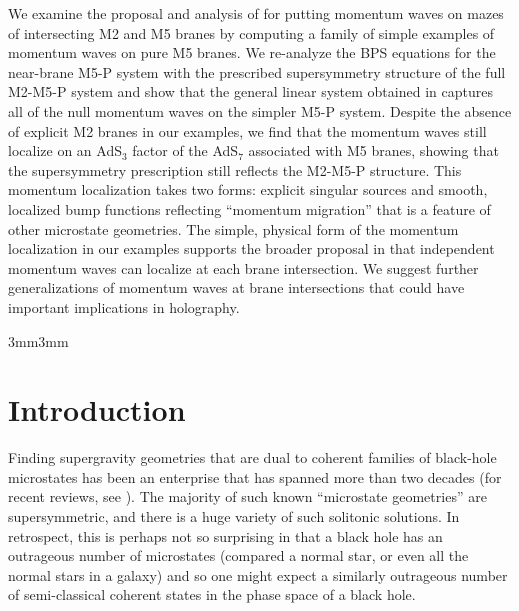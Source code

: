\documentclass[11pt]{article}
\numberwithin{equation}{section}
\begin{document}
\noindent We examine the  proposal  and analysis of \cite{Bena:2024qed} for putting momentum waves on mazes of intersecting M2 and M5 branes by computing a family of simple examples of momentum waves on pure M5 branes.  We re-analyze the BPS equations for the near-brane M5-P system with the prescribed supersymmetry structure of the full M2-M5-P system and show that the general linear system obtained in  \cite{Bena:2024qed} captures all of the null momentum waves on the simpler M5-P system.  Despite the absence of explicit M2 branes in our examples, we find that  the momentum waves still localize on an AdS$_3$  factor of the AdS$_7$ associated with M5 branes, showing that the supersymmetry prescription still reflects the M2-M5-P structure.  This momentum localization takes two forms:  explicit singular sources and smooth, localized bump functions reflecting  ``momentum migration'' that is a feature of other microstate  geometries. The simple, physical form of the momentum localization in our examples supports the broader proposal in  \cite{Bena:2024qed} that independent momentum waves can localize at each brane intersection.  We suggest further generalizations of momentum waves at brane intersections that could have important implications in holography.






\begin{adjustwidth}{3mm}{3mm} %
 
\vspace{-1.2mm}
\noindent


\end{adjustwidth}

\thispagestyle{empty}
\newpage


\tableofcontents


\section{Introduction}
\label{sec:Intro}
 
 Finding supergravity geometries that are dual to coherent families of black-hole microstates has been an enterprise that has spanned more than two decades (for recent reviews, see \cite{Bena:2022ldq,Bena:2022rna,Bena:2025pcy}).  The majority of such known  ``microstate geometries'' are supersymmetric, and there is a  huge variety of such solitonic solutions.  In retrospect, this is perhaps not so surprising in that a black hole has an outrageous number of microstates (compared a normal star, or even all the normal stars in a galaxy) and so one might expect a similarly outrageous number of semi-classical coherent states in the phase space of a black hole.  
 
\end{document}
